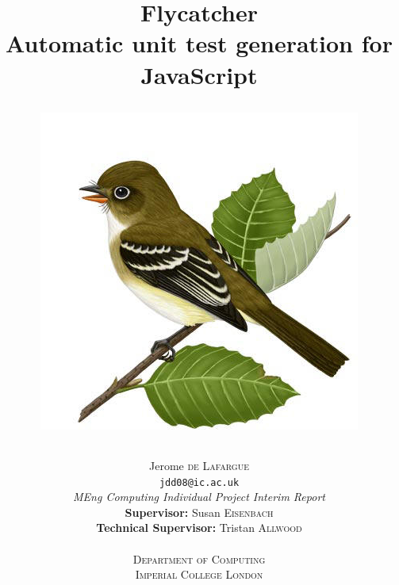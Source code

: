 \documentclass[a4paper,11pt,titlepage]{report}
\begin{document}
	
	\title
	{
		{\Huge \textbf{Flycatcher} \\[0.2cm]}
		{Automatic unit test generation for JavaScript\\[0.5cm]}
		\begin{figure}[h]
			\centering
			\includegraphics[scale=0.4]{flycatcher.jpg}
		\end{figure}
	}
	\author
	{	
		{\large Jerome \textsc{de Lafargue}}\\
		\texttt{\scriptsize jdd08@ic.ac.uk}\\[4cm]
		{\emph{MEng Computing Individual Project Interim Report}}\\[1.2cm]
		\textbf{\small Supervisor:}
		{\small Susan \textsc{Eisenbach}}\\
		\textbf{\small Technical Supervisor:}
		{\small Tristan \textsc{Allwood}}\\\\[0.5cm]
		\textsc{\scriptsize Department of Computing}\\
		\textsc{\small Imperial College London}
	}

	
	\date{}
	\maketitle

\tableofcontents
\end{document}
